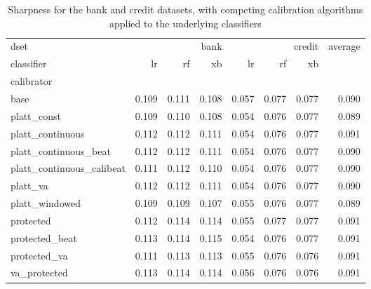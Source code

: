 \begin{table}
\caption{Sharpness for the bank and credit datasets, with competing calibration algorithms applied to the underlying classifiers}
\begin{tabular}{l|rrr|rrr|r|}
dset & \multicolumn{3}{r}{bank} & \multicolumn{3}{r}{credit} & average \\
classifier & lr & rf & xb & lr & rf & xb &  \\
calibrator &  &  &  &  &  &  &  \\
base & 0.109 & 0.111 & 0.108 & 0.057 & 0.077 & 0.077 & 0.090 \\
platt_const & 0.109 & 0.110 & 0.108 & 0.054 & 0.076 & 0.077 & 0.089 \\
platt_continuous & 0.112 & 0.112 & 0.111 & 0.054 & 0.076 & 0.077 & 0.091 \\
platt_continuous_beat & 0.112 & 0.112 & 0.111 & 0.054 & 0.076 & 0.077 & 0.090 \\
platt_continuous_calibeat & 0.111 & 0.112 & 0.110 & 0.054 & 0.076 & 0.077 & 0.090 \\
platt_va & 0.112 & 0.112 & 0.111 & 0.054 & 0.076 & 0.077 & 0.090 \\
platt_windowed & 0.109 & 0.109 & 0.107 & 0.055 & 0.076 & 0.077 & 0.089 \\
protected & 0.112 & 0.114 & 0.114 & 0.055 & 0.077 & 0.077 & 0.091 \\
protected_beat & 0.113 & 0.114 & 0.115 & 0.054 & 0.076 & 0.077 & 0.091 \\
protected_va & 0.111 & 0.113 & 0.113 & 0.055 & 0.076 & 0.076 & 0.091 \\
va_protected & 0.113 & 0.114 & 0.114 & 0.056 & 0.076 & 0.076 & 0.091 \\
\end{tabular}
\end{table}
